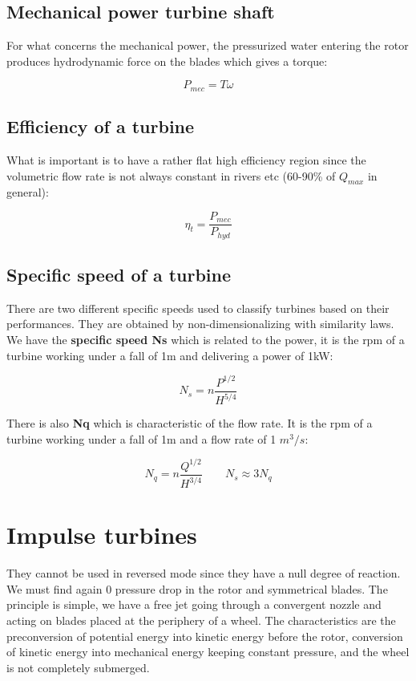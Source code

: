 \subsection{Mechanical power turbine shaft}
For what concerns the mechanical power, the pressurized water entering the rotor produces hydrodynamic force on the blades which gives a torque: 

\begin{equation}
P _{mec} = T \omega
\end{equation}

\subsection{Efficiency of a turbine}
What is important is to have a rather flat high efficiency region since the volumetric flow rate is not always constant in rivers etc (60-90\% of $Q_{max}$ in general): 

\begin{equation}
\eta _t = \frac{P_{mec}}{P_{hyd}}
\end{equation} 

\subsection{Specific speed of a turbine}
There are two different specific speeds used to classify turbines based on their performances. They are obtained by non-dimensionalizing with similarity laws. We have the \textbf{specific speed Ns} which is related to the power, it is the rpm of a turbine working under a fall of 1m and delivering a power of 1kW: 

\begin{equation}
N_s = n \frac{P^{1/2}}{H^{5/4}}
\end{equation}

There is also \textbf{Nq} which is characteristic of the flow rate. It is the rpm of a turbine working under a fall of 1m and a flow rate of 1 $m^3/s$: 

\begin{equation}
N_q = n \frac{Q^{1/2}}{H^{3/4}}\qquad N_s \approx 3N_q
\end{equation}

\section{Impulse turbines}
They cannot be used in reversed mode since they have a null degree of reaction. We must find again 0 pressure drop in the rotor and symmetrical blades. The principle is simple, we have a free jet going through a convergent nozzle and acting on blades placed at the periphery of a wheel. The characteristics are the preconversion of potential energy into kinetic energy before the rotor, conversion of kinetic energy into mechanical energy keeping constant pressure, and the wheel is not completely submerged. 

